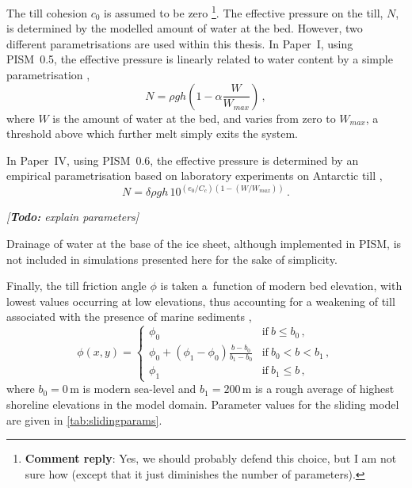 \documentclass{article}
\newcommand{\renote}[1]{\footnote{\textbf{Comment reply}: #1}}
\newcommand{\todo}[1]{\emph{[\textbf{Todo:} #1]}}
\newcommand{\CCLI}[0]{Paper~I}      %
\newcommand{\CCYC}[0]{Paper~IV}     %
\begin{document}
The till cohesion $c_0$ is assumed to be zero \renote{
  Yes, we should probably defend this choice, but I am not sure how (except
  that it just diminishes the number of parameters).}.
The effective pressure on the
till, $N$, is determined by the modelled amount of water at the bed. However,
two different parametrisations are used within this thesis. In {\CCLI}, using
PISM~0.5, the effective pressure is linearly related to water content by a
simple parametrisation \citep[Eq.~13]{Winkelmann.etal.2011},
\begin{equation}
    N = \rho gh (1 - \alpha \frac{W}{W_{max}}) \,,
\end{equation}
where $W$ is the amount of water at the bed, and varies from zero to $W_{max}$,
a threshold above which further melt simply exits the system.

In {\CCYC}, using PISM~0.6, the effective pressure is determined by an
empirical parametrisation based on laboratory experiments on Antarctic till
\citep{Tulaczyk.etal.2000, Bueler.Pelt.2014},
\begin{equation}
    N = \delta \rho gh \, 10^{(e_0/C_c) (1 - (W/W_{max}))} \,.
\end{equation}

\todo{explain parameters}

Drainage of water at the base of the ice sheet, although implemented in PISM,
is not included in simulations presented here for the sake of simplicity.

Finally, the till friction angle $\phi$ is taken a~function of modern bed
elevation, with lowest values occurring at low elevations, thus accounting for
a weakening of till associated with the presence of marine sediments
\citep[cf.][Eq.~10]{Martin.etal.2011},
\begin{equation}
    \phi(x,y) =
    \begin{cases}
        \phi_0 & \text{if}\ b \le b_0 \,, \\
        \phi_0 + (\phi_1-\phi_0) \frac{b - b_0}{b_1-b_0}
                & \text{if}\ b_0 < b < b_1 \,, \\
        \phi_1 & \text{if}\ b_1 \le b \,,
    \end{cases}
\end{equation}
where $b_0=0$\,m is modern sea-level and $b_1=200$\,m is a rough average of
highest shoreline elevations in the model domain. Parameter values for the
sliding model are given in \cref{tab:slidingparams}.
\end{document}
